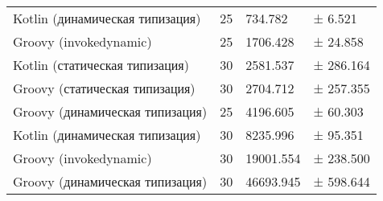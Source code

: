 \begin{table}[h]
\begin{center}
\begin{tabular}{|l|p{}|l|l|}
Kotlin (динамическая типизация)         & 25 &  734.782 & ±   6.521\\
Groovy (invokedynamic)                  & 25 & 1706.428 & ±  24.858\\
Kotlin (статическая типизация)          & 30 & 2581.537 & ± 286.164\\
Groovy (статическая типизация)          & 30 & 2704.712 & ± 257.355\\
Groovy (динамическая типизация)         & 25 & 4196.605 & ±  60.303\\
Kotlin (динамическая типизация)         & 30 & 8235.996 & ±  95.351\\
Groovy (invokedynamic)                  & 30 & 19001.554 & ± 238.500\\
Groovy (динамическая типизация)         & 30 & 46693.945 & ± 598.644\\
\hline
\end{tabular}
\end{center}
\end{table} 
    
    
    

